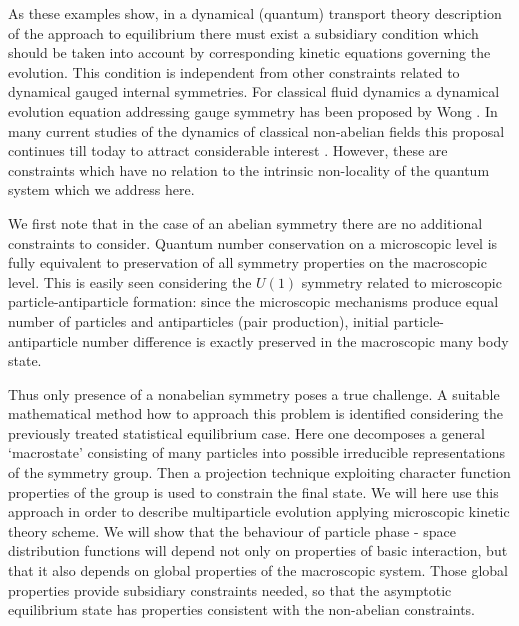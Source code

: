 \documentclass[a4paper,11pt]{article}
\begin{document}
As these examples show, in a dynamical (quantum) transport theory
description of the approach to equilibrium there must exist a
subsidiary condition which should be taken into account by
corresponding kinetic equations governing the evolution. This
condition is independent from other constraints related to
dynamical gauged internal symmetries. For classical fluid dynamics
a dynamical evolution equation addressing gauge symmetry has been
proposed by Wong \cite{Won70}. In many current studies of the
dynamics of classical non-abelian fields this proposal continues
till today to attract considerable interest \cite{LM99}. However,
these are constraints which have no relation to the intrinsic
non-locality of the quantum system which we address here.

We first note that in the case of an abelian symmetry there are no
additional constraints to consider. Quantum number conservation on
a microscopic level is fully equivalent to preservation of all
symmetry properties on the macroscopic level. This is easily seen
considering the $U(1)$ symmetry related to microscopic
particle-antiparticle formation: since the microscopic mechanisms
produce equal number of particles and antiparticles (pair
production), initial particle-antiparticle number difference is
exactly preserved in the  macroscopic many body state.

Thus only presence of a nonabelian symmetry poses a true
challenge. A suitable mathematical method how to approach this
problem is identified considering  the previously treated
statistical equilibrium case.  Here one decomposes a general
`macrostate' consisting of many particles into possible
irreducible representations of the symmetry group. Then a
projection technique exploiting character function properties of
the group is used to constrain the final state. We will here use
this approach in order to describe multiparticle evolution
applying microscopic kinetic theory scheme. We will show that the
behaviour of particle phase - space distribution functions will
depend not only on properties of basic interaction, but that it
also depends on global properties of the macroscopic system. Those
global properties provide subsidiary constraints needed, so that
the asymptotic equilibrium state has properties  consistent with
the non-abelian constraints.
\end{document}
